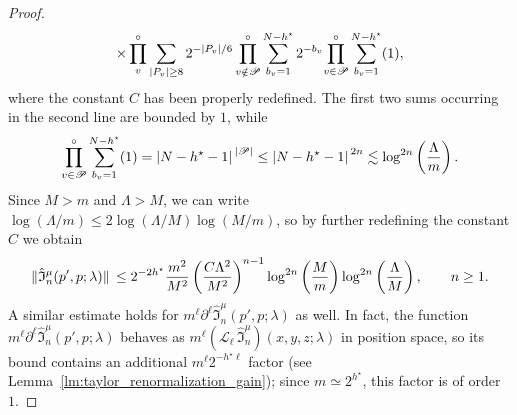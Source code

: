 \documentclass[a4paper, 11pt]{article}
\newcommand{\cutoff}{\Lambda}								%
\newcommand{\kloc}{\mathscr{L}}								%
\theoremstyle{thm}
\begin{document}
\begin{proof}
\begin{multline}
\times \prod^\circ_v \sum_{\abs*{P_v} \ge 8} 2^{-\abs*{P_v}/6}\prod^\circ_{v \notin \mathscr{P}} \sum_{b_v = 1}^{N-h^\star} 2^{-b_v} \! \prod^\circ_{v \in \mathscr{P}} \sum_{b_v=1}^{N-h^\star} (1),
\end{multline}
where the constant $C$ has been properly redefined. The first two sums occurring in the second line are bounded by $1$, while 
\begin{equation}
\prod^\circ_{v \in \mathscr{P}} \sum_{b_v=1}^{N-h^\star} (1) = \abs*{N - h^\star -1}^{\abs*{\mathscr{P}}} \le \abs*{N - h^\star -1}^{2n} \lesssim \log^{2n} \left( \frac{\cutoff}{m} \right).
\end{equation}
Since $M > m$ and $\cutoff > M$, we can write $\log(\cutoff/m) \le 2\log(\cutoff/M) \log(M/m)$, so by further redefining the constant $C$ we obtain
\begin{equation}
\label{eq:th:I_estimate}
\norm*{\hat{\mathfrak{I}}^\mu_n(p', p; \lambda)} \le  2^{-2h^\star} \frac{m^2}{M^2} \left(\frac{C \cutoff^{2}}{M^2} \right)^{n-1} \log^{2n} \left( \frac{M}{m} \right) \log^{2n} \left( \frac{\cutoff}{M} \right), \qquad n \ge 1.
\end{equation}
A similar estimate holds for $m^\ell \partial^\ell \hat{\mathfrak{I}}^\mu_n(p', p; \lambda)$ as well. In fact, the function $m^\ell \partial^\ell \hat{\mathfrak{I}}^\mu_n(p', p; \lambda)$ behaves as $m^\ell (\kloc_\ell \, \hat{\mathfrak{I}}^\mu_n)(x, y, z; \lambda)$ in position space, so its bound contains an additional $m^\ell 2^{-h^\star \ell}$ factor (see Lemma~\ref{lm:taylor_renormalization_gain}); since $m \simeq 2^{h^\star}$, this factor is of order $1$.


\end{proof}
\end{document}
